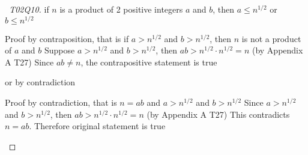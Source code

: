 \documentclass[a4paper]{article}
\theoremstyle{definition}
\begin{document}
\begin{proof}[\proofname\ T02Q10] if $n$ is a product of 2 positive integers $a$ and $b$, then $a \leq n^{1/2}$ or $b \leq n^{1/2}$ 
  \begin{numpf*}
    \pfln Proof by contraposition, that is if $a > n^{1/2}$ and $b > n^{1/2}$, then $n$ is not a product of $a$ and $b$
    \pfln Suppose $a > n^{1/2}$ and $b > n^{1/2}$, then $ab > n^{1/2} \cdot n^{1/2} = n$ (by Appendix A T27)
    \pfln Since $ab \not = n$, the contrapositive statement is true
  \end{numpf*}
   or by contradiction
  \begin{numpf*}
    \pfln Proof by contradiction, that is $n = ab$ and $a > n^{1/2}$ and $b > n^{1/2}$
    \pfln Since $a > n^{1/2}$ and $b > n^{1/2}$, then $ab > n^{1/2} \cdot n^{1/2} = n$ (by Appendix A T27)
    \pfln This contradicts $n = ab$. Therefore original statement is true
  \end{numpf*}
\end{proof}
\end{document}
